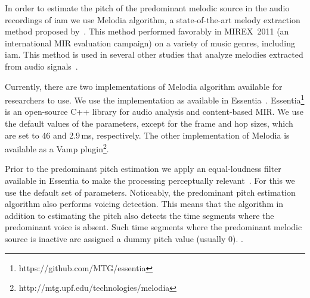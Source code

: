 {In order to estimate the pitch of the predominant melodic source in the audio recordings of \gls{iam} we use Melodia algorithm, a state-of-the-art melody extraction method proposed by~\cite{Salamon2012}. This method performed favorably in MIREX~2011 (an international MIR evaluation campaign) on a variety of music genres, including \gls{iam}. This method is used in several other studies that analyze melodies extracted from audio signals~\citep{Dutta2014,Ishwar2013,Rao2014,koduri2014intonation,senturk2013score,pikrakis2012tracking}. %

Currently, there are two implementations of Melodia algorithm available for researchers to use. We use the implementation as available in Essentia~\citep{essentia}. Essentia\footnote{https://github.com/MTG/essentia} is an open-source C++ library for audio analysis and content-based MIR. We use the default values of the parameters, except for the frame and hop sizes, which are set to 46 and 2.9\,ms, respectively. The other implementation of Melodia is available as a Vamp plugin\footnote{http://mtg.upf.edu/technologies/melodia}. 

Prior to the predominant pitch estimation we apply an equal-loudness filter available in Essentia to make the processing perceptually relevant~. For this we use the default set of parameters. Noticeably, the predominant pitch estimation algorithm also performs voicing detection. This means that the algorithm in addition to estimating the pitch also detects the time segments where the predominant voice is absent. Such time segments where the predominant melodic source is inactive are assigned a dummy pitch value (usually 0). .

}
